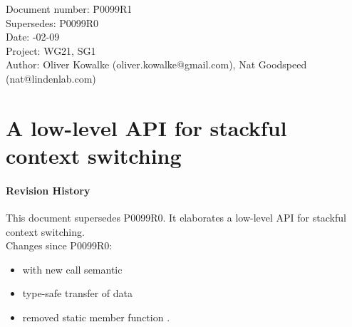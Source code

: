 \documentclass[paper=A4,pagesize,DIV=15]{scrartcl}
\begin{document}
\small
\begin{tabbing}
    Document number: \= P0099R1\\
    Supersedes:      \> P0099R0\\
    Date:            -02-09\\
    Project:         \> WG21, SG1\\
    Author:          \> Oliver Kowalke (oliver.kowalke@gmail.com), Nat Goodspeed (nat@lindenlab.com)\\
\end{tabbing}

\section*{A low-level API for stackful context switching}


\tableofcontents


\paragraph*{Revision History}
This document supersedes P0099R0. It elaborates a low-level API for stackful
context switching.\\
\newline
Changes since P0099R0:

\begin{itemize}
    \item {} with new call semantic
    \item type-safe transfer of data
    \item removed static member function .
\end{itemize}




%











\end{document}

